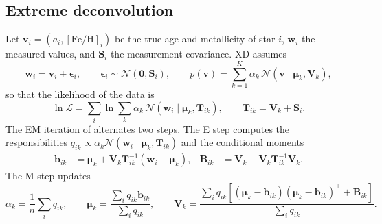 \documentclass[11pt,a4paper]{article}
\newcommand{\feh}{\ensuremath{[\mathrm{Fe/H}]}}
\newcommand{\N}{\ensuremath{\mathcal{N}}}
\begin{document}
\subsection{Extreme deconvolution}
Let $\bm v_i=(a_i,\feh_i)$ be the true age and metallicity of star $i$, $\bm w_i$ the measured values, and $\mathbf S_i$ the measurement covariance. XD assumes
\begin{equation}
  \bm w_i = \bm v_i + \bm\epsilon_i,\qquad \bm\epsilon_i\sim\N(\bm 0,\mathbf S_i),\qquad
  p(\bm v)=\sum_{k=1}^{K}\alpha_k\,\N(\bm v\mid\bm\mu_k,\mathbf V_k),
  \label{eq:xd_model}
\end{equation}
so that the likelihood of the data is
\begin{equation}
  \ln\mathcal L=\sum_i\ln\sum_k\alpha_k\,\N(\bm w_i\mid\bm\mu_k,\mathbf T_{ik}),\qquad \mathbf T_{ik}=\mathbf V_k+\mathbf S_i .
  \label{eq:xd_like}
\end{equation}
The EM iteration of \citet{Bovy2011} alternates two steps. The E step computes the responsibilities $q_{ik}\propto\alpha_k\N(\bm w_i\mid\bm\mu_k,\mathbf T_{ik})$ and the conditional moments
\begin{align}
  \bm b_{ik}&=\bm\mu_k+\mathbf V_k\mathbf T_{ik}^{-1}(\bm w_i-\bm\mu_k), &
  \mathbf B_{ik}&=\mathbf V_k-\mathbf V_k\mathbf T_{ik}^{-1}\mathbf V_k .
\end{align}
The M step updates
\begin{equation}
  \alpha_k=\frac{1}{n}\sum_i q_{ik},\qquad
  \bm\mu_k=\frac{\sum_i q_{ik}\bm b_{ik}}{\sum_i q_{ik}},\qquad
  \mathbf V_k=\frac{\sum_i q_{ik}\left[(\bm\mu_k-\bm b_{ik})(\bm\mu_k-\bm b_{ik})^{\!\top}+\mathbf B_{ik}\right]}{\sum_i q_{ik}} .
\end{equation}
\end{document}
